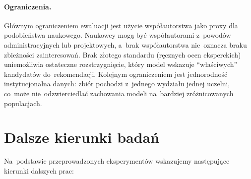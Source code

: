 \paragraph{Ograniczenia.}

Głównym ograniczeniem ewaluacji jest użycie współautorstwa
jako proxy dla podobieństwa naukowego.
Naukowcy mogą być współautorami z~powodów administracyjnych
lub projektowych, a~brak współautorstwa nie~oznacza braku
zbieżności zainteresowań.
Brak złotego standardu (ręcznych ocen eksperckich)
uniemożliwia ostateczne rozstrzygnięcie, który model wskazuje
``właściwych'' kandydatów do~rekomendacji.
Kolejnym ograniczeniem jest jednorodność instytucjonalna danych:
zbiór pochodzi z~jednego wydziału jednej uczelni,
co~może nie~odzwierciedlać zachowania modeli na~bardziej
zróżnicowanych populacjach.

\section{Dalsze kierunki badań}
\label{sec:future_work}

Na~podstawie przeprowadzonych eksperymentów wskazujemy
następujące kierunki dalszych prac:

